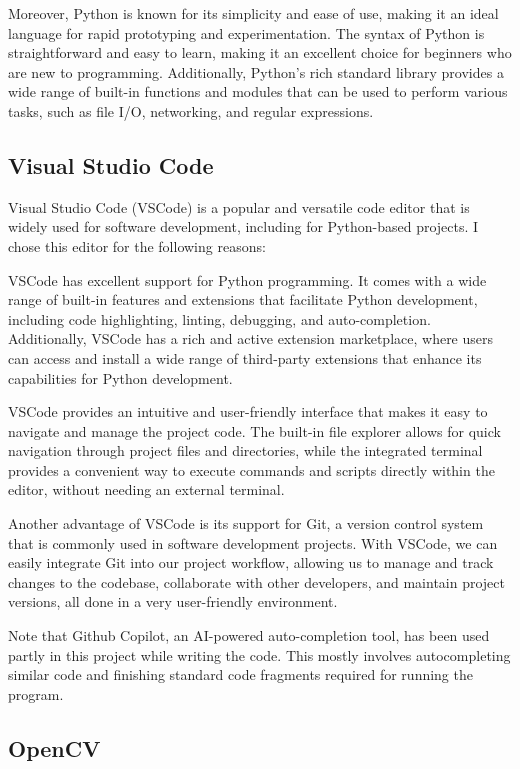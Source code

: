 \documentclass[final,rdr32.tex]{subfiles}
\begin{document}
Moreover, Python is known for its simplicity and ease of use, making it an ideal language for rapid prototyping and experimentation. The syntax of Python is straightforward and easy to learn, making it an excellent choice for beginners who are new to programming. Additionally, Python's rich standard library provides a wide range of built-in functions and modules that can be used to perform various tasks, such as file I/O, networking, and regular expressions.


\subsection{Visual Studio Code}

Visual Studio Code (VSCode) is a popular and versatile code editor that is widely used for software development, including for Python-based projects. I chose this editor for the following reasons:

VSCode has excellent support for Python programming. It comes with a wide range of built-in features and extensions that facilitate Python development, including code highlighting, linting, debugging, and auto-completion. Additionally, VSCode has a rich and active extension marketplace, where users can access and install a wide range of third-party extensions that enhance its capabilities for Python development.

VSCode provides an intuitive and user-friendly interface that makes it easy to navigate and manage the project code. The built-in file explorer allows for quick navigation through project files and directories, while the integrated terminal provides a convenient way to execute commands and scripts directly within the editor, without needing an external terminal.

Another advantage of VSCode is its support for Git, a version control system that is commonly used in software development projects. With VSCode, we can easily integrate Git into our project workflow, allowing us to manage and track changes to the codebase, collaborate with other developers, and maintain project versions, all done in a very user-friendly environment.

Note that Github Copilot, an AI-powered auto-completion tool, has been used partly in this project while writing the code. This mostly involves autocompleting similar code and finishing standard code fragments required for running the program.

\subsection{OpenCV}
\end{document}
